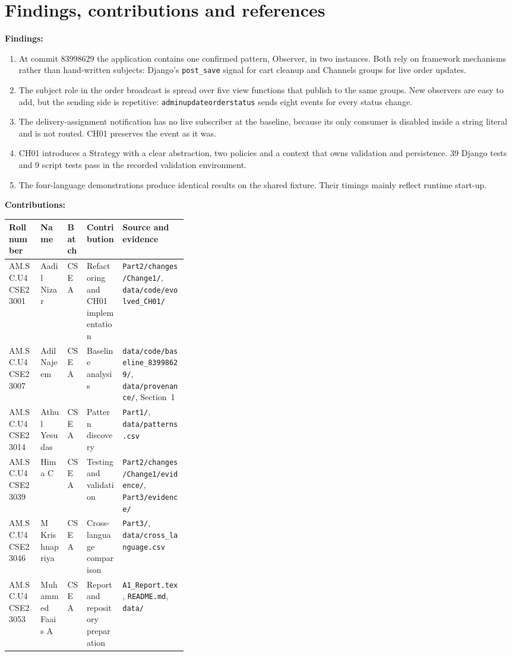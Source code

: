 \documentclass[11pt,a4paper]{article}
\newcommand{\entry}[1]{\par\textbf{#1:} }
\newcommand{\code}[1]{\nolinkurl{#1}}
\begin{document}
\section{Findings, contributions and references}
\entry{Findings}
\begin{enumerate}
\item At commit 83998629 the application contains one confirmed pattern, Observer, in two instances. Both rely on framework mechanisms rather than hand-written subjects: Django's \code{post_save} signal for cart cleanup and Channels groups for live order updates.
\item The subject role in the order broadcast is spread over five view functions that publish to the same groups. New observers are easy to add, but the sending side is repetitive: \code{adminupdateorderstatus} sends eight events for every status change.
\item The delivery-assignment notification has no live subscriber at the baseline, because its only consumer is disabled inside a string literal and is not routed. CH01 preserves the event as it was.
\item CH01 introduces a Strategy with a clear abstraction, two policies and a context that owns validation and persistence. 39 Django tests and 9 script tests pass in the recorded validation environment.
\item The four-language demonstrations produce identical results on the shared fixture. Their timings mainly reflect runtime start-up.
\end{enumerate}
\entry{Contributions}\par
{\small\begin{tabularx}{\linewidth}{@{}lp{0.15\linewidth}lp{0.2\linewidth}X@{}}\toprule
Roll number & Name & Batch & Contribution & Source and evidence\\\midrule
AM.SC.U4CSE23001 & Aadil Nizar & CSE A & Refactoring and CH01 implementation & \code{Part2/changes/Change1/}, \code{data/code/evolved_CH01/}\\
AM.SC.U4CSE23007 & Adil Najeem & CSE A & Baseline analysis & \code{data/code/baseline_83998629/}, \code{data/provenance/}, Section~1\\
AM.SC.U4CSE23014 & Athul Yesudas & CSE A & Pattern discovery & \code{Part1/}, \code{data/patterns.csv}\\
AM.SC.U4CSE23039 & Hima C & CSE A & Testing and validation & \code{Part2/changes/Change1/evidence/}, \code{Part3/evidence/}\\
AM.SC.U4CSE23046 & M Krishnapriya & CSE A & Cross-language comparison & \code{Part3/}, \code{data/cross_language.csv}\\
AM.SC.U4CSE23053 & Muhammed Faais A & CSE A & Report and repository preparation & \code{A1_Report.tex}, \code{README.md}, \code{data/}\\\bottomrule
\end{tabularx}}
\end{document}
